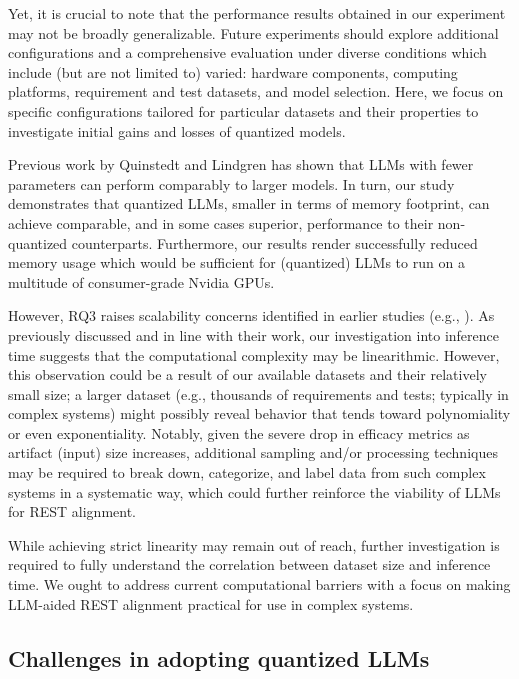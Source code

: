 \documentclass[conference]{IEEEtran}
\begin{document}
Yet, it is crucial to note that the performance results obtained in our experiment may not be broadly generalizable. Future experiments should explore additional configurations and a comprehensive evaluation under diverse conditions which include (but are not limited to) varied: hardware components, computing platforms, requirement and test datasets, and model selection. Here, we focus on specific configurations tailored for particular datasets and their properties to investigate initial gains and losses of quantized models.

Previous work by Quinstedt and Lindgren \cite{quinstedt2024Optimizing} has shown that LLMs with fewer parameters can perform comparably to larger models. In turn, our study demonstrates that quantized LLMs, smaller in terms of memory footprint, can achieve comparable, and in some cases superior, performance to their non-quantized counterparts. Furthermore, our results render successfully reduced memory usage which would be sufficient for (quantized) LLMs to run on a multitude of consumer-grade Nvidia GPUs.

However, RQ3 raises scalability concerns identified in earlier studies (e.g., \cite{ivarsson2023automated}). As previously discussed and in line with their work, our investigation into inference time suggests that the computational complexity may be linearithmic. However, this observation could be a result of our available datasets and their relatively small size; a larger dataset (e.g., thousands of requirements and tests; typically in complex systems) might possibly reveal behavior that tends toward polynomiality or even exponentiality. Notably, given the severe drop in efficacy metrics as artifact (input) size increases, additional sampling and/or processing techniques may be required to break down, categorize, and label data from such complex systems in a systematic way, which could further reinforce the viability of LLMs for REST alignment.

While achieving strict linearity may remain out of reach, further investigation is required to fully understand the correlation between dataset size and inference time. We ought to address current computational barriers with a focus on making LLM-aided REST alignment practical for use in complex systems.

\subsection{Challenges in adopting quantized LLMs}
\end{document}
